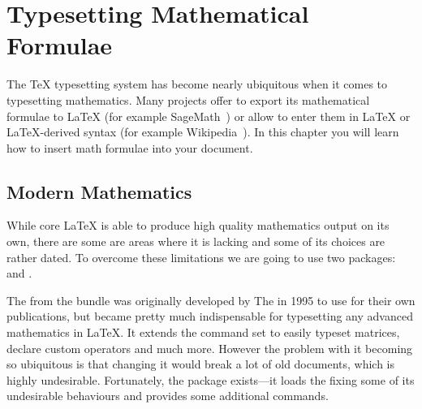 %
%
%
%


\chapter{Typesetting Mathematical Formulae}\label{chap:math}

\begin{intro}
  The \TeX{} typesetting system has become nearly ubiquitous when it comes to
  typesetting mathematics. Many projects offer to export its mathematical
  formulae to \LaTeX{} (for example SageMath~\cite{sagemath}) or allow to enter
  them in \LaTeX{} or \LaTeX{}-derived syntax (for example
  Wikipedia~\cite{enwiki:1091087776}). In this chapter you will learn how to
  insert math formulae into your document.
\end{intro}

\section{Modern Mathematics}

While core \LaTeX{} is able to produce high quality mathematics output on its
own, there are some are areas where it is lacking and some of its choices are
rather dated. To overcome these limitations we are going to use two packages:
 and .

The  from the  bundle was originally developed
by The \emph{} in 1995 to use for their own
publications, but became pretty much indispensable for typesetting any advanced
mathematics in \LaTeX. It extends the command set to easily typeset matrices,
declare custom operators and much more. However the problem with it becoming so
ubiquitous is that changing it would break a lot of old documents, which is
highly undesirable. Fortunately, the  package exists---it loads
the  fixing some of its undesirable behaviours and provides some
additional commands.

